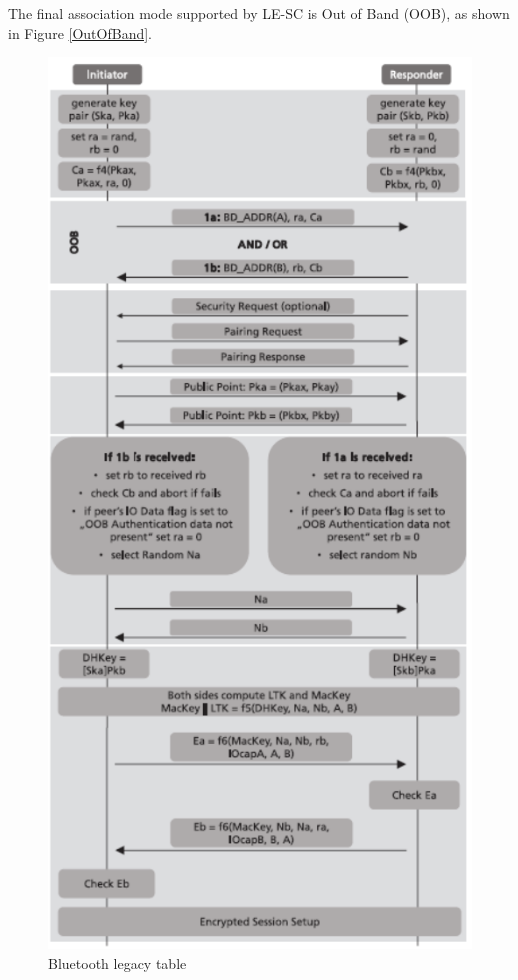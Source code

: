 \documentclass{Configuration_Files/PoliMi3i_thesis}
\begin{document}
The final association mode supported by LE-SC is Out of Band (OOB), as shown in Figure \ref{OutOfBand}.

\begin{figure}[H]
    \centering
    \includegraphics[scale=0.7]{Bluetooth_Security/8.png}
    \caption{Bluetooth legacy table}
    \label{bluetooth_sec_8}
\end{figure}
\end{document}
